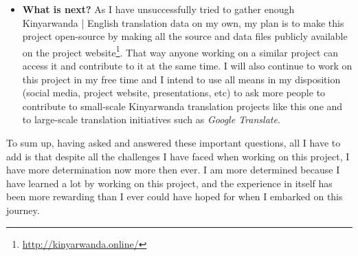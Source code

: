 \begin{itemize}
    \item \textbf{What is next?} As I have unsuccessfully tried to gather enough Kinyarwanda | English translation data on my own, my plan is to make this project open-source by making all the source and data files publicly available on the project website\footnote{\protect\url{http://kinyarwanda.online/}}. That way anyone working on a similar project can access it and contribute to it at the same time. I will also continue to work on this project in my free time and I intend to use all means in my disposition (social media, project website, presentations, etc) to ask more people to contribute to small-scale Kinyarwanda translation projects like this one and to large-scale translation initiatives such as \textit{Google Translate}.
    
\end{itemize}


To sum up, having asked and answered these important questions, all I have to add is that despite all the challenges I have faced when working on this project, I have more determination now more then ever. I am more determined because I have learned a lot by working on this project, and the experience in itself has been more rewarding than I ever could have hoped for when I embarked on this journey.

